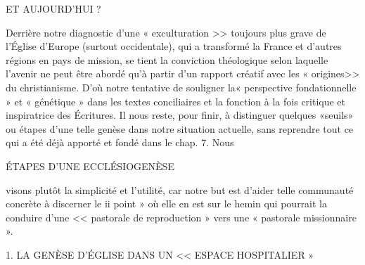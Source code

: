 ET AUJOURD'HUI ?

Derrière notre diagnostic d'une « exculturation >> toujours plus grave de l'Église d'Europe (surtout occidentale), qui a transformé la France et d'autres régions en pays de mission, se tient la conviction théologique selon laquelle l'avenir ne peut être abordé qu'à partir d'un rapport créatif avec les « origines>> du christianisme. D'où notre tentative de souligner la« perspective fondationnelle » et « génétique » dans les textes conciliaires et la fonction à la fois critique et inspiratrice des Écritures. Il nous reste, pour finir, à distinguer quelques «seuils» ou étapes d'une telle genèse dans notre situation actuelle, sans reprendre tout ce qui a été déjà apporté et fondé dans le chap. 7. Nous
 
ÉTAPES D'UNE ECCLÉSIOGENÈSE

visons plutôt la simplicité et l'utilité, car notre but est d'aider telle communauté concrète à discerner le ii point » où elle en est sur le hemin qui pourrait la conduire d'une << pastorale de reproduction » vers une « pastorale missionnaire ».

1.	LA GENÈSE D'ÉGLISE
DANS UN << ESPACE HOSPITALIER »

